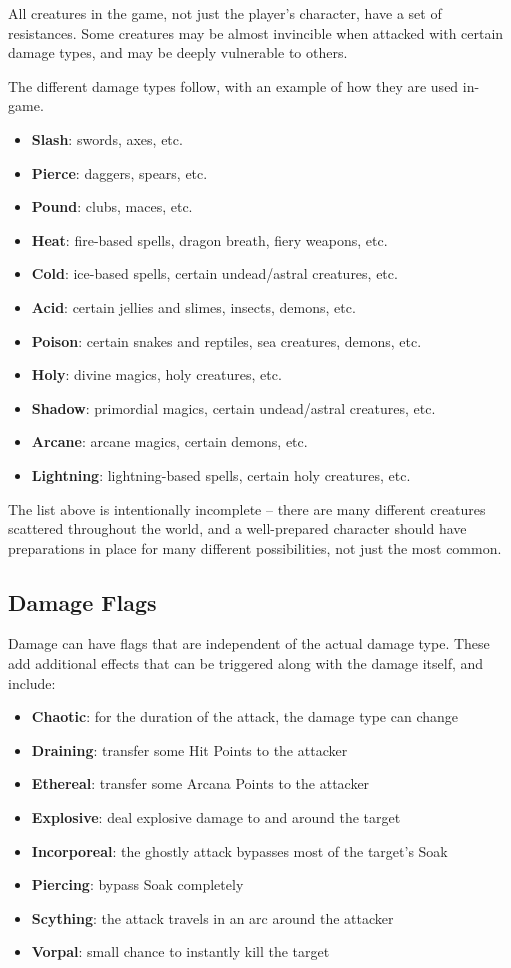 All creatures in the game, not just the player's character, have a set of 
resistances.  Some creatures may be almost invincible when attacked with
certain damage types, and may be deeply vulnerable to others.

The different damage types follow, with an example of how they are used
in-game.

\begin{itemize}
\item {\bf Slash}: swords, axes, etc.
\item {\bf Pierce}: daggers, spears, etc.
\item {\bf Pound}: clubs, maces, etc.
\item {\bf Heat}: fire-based spells, dragon breath, fiery weapons, etc.
\item {\bf Cold}: ice-based spells, certain undead/astral creatures, etc.
\item {\bf Acid}: certain jellies and slimes, insects, demons, etc.
\item {\bf Poison}: certain snakes and reptiles, sea creatures, demons, etc.
\item {\bf Holy}: divine magics, holy creatures, etc.
\item {\bf Shadow}: primordial magics, certain undead/astral creatures, etc.
\item {\bf Arcane}: arcane magics, certain demons, etc.
\item {\bf Lightning}: lightning-based spells, certain holy creatures, etc.
\end{itemize}

The list above is intentionally incomplete -- there are many different
creatures scattered throughout the world, and a well-prepared character 
should have preparations in place for many different possibilities, not 
just the most common.

\subsection{Damage Flags}

Damage can have flags that are independent of the actual damage type.
These add additional effects that can be triggered along with the damage
itself, and include:

\begin{itemize}
\item {\bf Chaotic}: for the duration of the attack, the damage type can change
\item {\bf Draining}: transfer some Hit Points to the attacker
\item {\bf Ethereal}: transfer some Arcana Points to the attacker
\item {\bf Explosive}: deal explosive damage to and around the target
\item {\bf Incorporeal}: the ghostly attack bypasses most of the target's Soak
\item {\bf Piercing}: bypass Soak completely
\item {\bf Scything}: the attack travels in an arc around the attacker
\item {\bf Vorpal}: small chance to instantly kill the target
\end{itemize}

